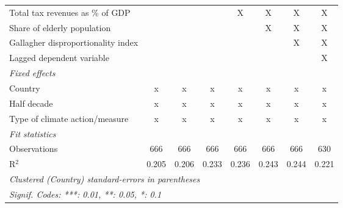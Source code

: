 \begin{table}[htbp]
\begin{tabular}{lccccccc}
      Total tax revenues as \% of GDP                                           &              &              &                & X              & X              & X              & X\\  
      Share of elderly population                                               &              &              &                &                & X              & X              & X\\  
      Gallagher disproportionality index                                        &              &              &                &                &                & X              & X\\  
      Lagged dependent variable                                                 &              &              &                &                &                &                & X\\  
      \emph{Fixed effects}\\
      Country                                                                   & x            & x            & x              & x              & x              & x              & x\\  
      Half decade                                                               & x            & x            & x              & x              & x              & x              & x\\  
      Type of climate action/measure                                            & x            & x            & x              & x              & x              & x              & x\\  
      \midrule \emph{Fit statistics}\\
      Observations                                                              & 666          & 666          & 666            & 666            & 666            & 666            & 630\\  
      R$^2$                                                                     & 0.205        & 0.206        & 0.233          & 0.236          & 0.243          & 0.244          & 0.221\\  
      \midrule
      \multicolumn{8}{l}{\emph{Clustered (Country) standard-errors in parentheses}}\\
      \multicolumn{8}{l}{\emph{Signif. Codes: ***: 0.01, **: 0.05, *: 0.1}}\\
   \end{tabular}
\end{table}


